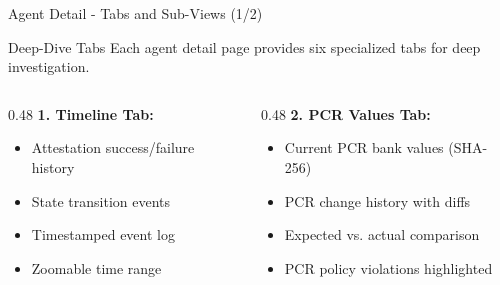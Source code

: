 \begin{frame}{Agent Detail - Tabs and Sub-Views (1/2)}
  \begin{block}{Deep-Dive Tabs}
    \scriptsize
    Each agent detail page provides six specialized tabs for deep investigation.
  \end{block}

  \vspace{0.2cm}

  \scriptsize
  \begin{columns}[T]
    \begin{column}{0.48\textwidth}
      \textbf{1. Timeline Tab:}
      \begin{itemize}
        \item Attestation success/failure history
        \item State transition events
        \item Timestamped event log
        \item Zoomable time range
      \end{itemize}
    \end{column}
    \begin{column}{0.48\textwidth}
      \textbf{2. PCR Values Tab:}
      \begin{itemize}
        \item Current PCR bank values (SHA-256)
        \item PCR change history with diffs
        \item Expected vs. actual comparison
        \item PCR policy violations highlighted
      \end{itemize}
    \end{column}
  \end{columns}

  \vspace{0.3cm}


\end{frame}
